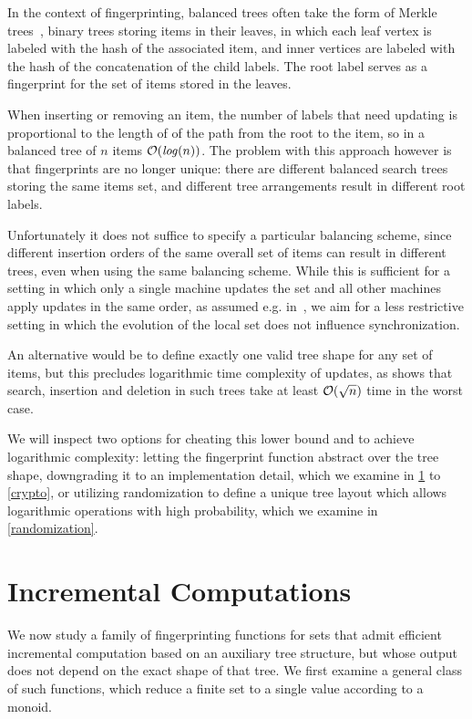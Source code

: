 In the context of fingerprinting, balanced trees often take the form of Merkle trees~\cite{merkle1989certified}, binary trees storing items in their leaves, in which each leaf vertex is labeled with the hash of the associated item, and inner vertices are labeled with the hash of the concatenation of the child labels. The root label serves as a fingerprint for the set of items stored in the leaves.

When inserting or removing an item, the number of labels that need updating is proportional to the length of of the path from the root to the item, so in a balanced tree of $n$ items $\mathcal{O}(\mathit{log}(n))$. The problem with this approach however is that fingerprints are no longer unique: there are different balanced search trees storing the same items set, and different tree arrangements result in different root labels.

Unfortunately it does not suffice to specify a particular balancing scheme, since different insertion orders of the same overall set of items can result in different trees, even when using the same balancing scheme. While this is sufficient for a setting in which only a single machine updates the set and all other machines apply updates in the same order, as assumed e.g. in~\cite{naor2000certificate}, we aim for a less restrictive setting in which the evolution of the local set does not influence synchronization.

An alternative would be to define exactly one valid tree shape for any set of items, but this precludes logarithmic time complexity of updates, as \cite{uniquerepresentation} shows that search, insertion and deletion in such trees take at least $\mathcal{O}(\sqrt{n})$ time in the worst case.

We will inspect two options for cheating this lower bound and to achieve logarithmic complexity: letting the fingerprint function abstract over the tree shape, downgrading it to an implementation detail, which we examine in \cref{group-fingerprints} to \cref{crypto}, or utilizing randomization to define a unique tree layout which allows logarithmic operations with high probability, which we examine in \cref{randomization}.

\section{Incremental Computations}
\label{group-fingerprints}

We now study a family of fingerprinting functions for sets that admit efficient incremental computation based on an auxiliary tree structure, but whose output does not depend on the exact shape of that tree. We first examine a general class of such functions, which reduce a finite set to a single value according to a monoid.

